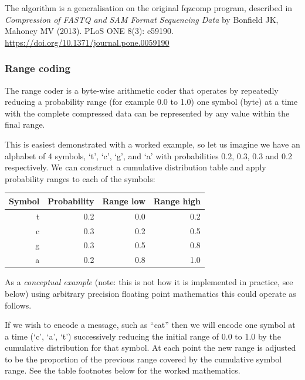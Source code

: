 \documentclass[a4paper]{article}
\begin{document}
The algorithm is a generalisation on the original fqzcomp program,
described in \textit{Compression of FASTQ and SAM Format Sequencing
  Data} by Bonfield JK, Mahoney MV (2013). PLoS ONE 8(3):
e59190. \url{https://doi.org/10.1371/journal.pone.0059190}

\subsubsection*{Range coding}

The range coder is a byte-wise arithmetic coder that operates by
repeatedly reducing a probability range (for example 0.0 to 1.0) one
symbol (byte) at a time with the complete compressed data can be
represented by any value within the final range.

This is easiest demonstrated with a worked example, so let us imagine
we have an alphabet of 4 symbols, `t', `c', `g', and `a' with
probabilities 0.2, 0.3, 0.3 and 0.2 respectively.  We can construct a
cumulative distribution table and apply probability ranges to each of
the symbols:

\begin{tabular}{rrrr}
\hline
\textbf{Symbol} & \textbf{Probability} & \textbf{Range low} & \textbf{Range high}\\
\hline
t & 0.2 & 0.0 & 0.2 \\
c & 0.3 & 0.2 & 0.5 \\
g & 0.3 & 0.5 & 0.8 \\
a & 0.2 & 0.8 & 1.0 \\
\hline
\end{tabular}

As a \emph{conceptual example} (note: this is not how it is implemented in practice, see below) using arbitrary precision floating point mathematics this could operate as follows.

If we wish to encode a message, such as ``cat'' then we will encode
one symbol at a time (`c', `a', `t') successively reducing the
initial range of 0.0 to 1.0 by the cumulative distribution for that
symbol.  At each point the new range is adjusted to be the proportion
of the previous range covered by the cumulative symbol range.  See the
table footnotes below for the worked mathematics.
\end{document}
